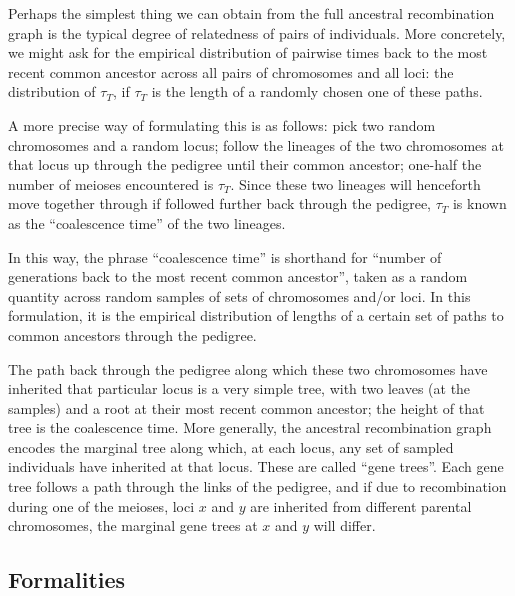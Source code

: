 Perhaps the simplest thing we can obtain from the full ancestral recombination graph 
is the typical degree of relatedness of pairs of individuals.
More concretely, we might ask for the empirical distribution
of pairwise times back to the most recent common ancestor
across all pairs of chromosomes and all loci:
the distribution of $\tau_T$, if $\tau_T$ is the length of a randomly chosen one of these paths.

A more precise way of formulating this is as follows:
pick two random chromosomes and a random locus;
follow the lineages of the two chromosomes at that locus up through the pedigree
until their common ancestor;
one-half the number of meioses encountered is $\tau_T$.
Since these two lineages will henceforth move together through if followed further back through the pedigree,
$\tau_T$ is known as the ``coalescence time'' of the two lineages.

In this way, the phrase ``coalescence time'' is shorthand
for ``number of generations back to the most recent common ancestor'',
taken as a random quantity across random samples of sets of chromosomes and/or loci.
In this formulation, it is the empirical distribution of lengths of a certain set of paths 
to common ancestors through the pedigree.

The path back through the pedigree along which these two chromosomes have inherited that particular locus
is a very simple tree, with two leaves (at the samples) and a root at their most recent common ancestor;
the height of that tree is the coalescence time.
More generally, the ancestral recombination graph encodes the marginal tree along which, 
at each locus, any set of sampled individuals have inherited at that locus.
These are called ``gene trees''.
Each gene tree follows a path through the links of the pedigree,
and if due to recombination during one of the meioses, 
loci $x$ and $y$ are inherited from different parental chromosomes,
the marginal gene trees at $x$ and $y$ will differ.


\subsection{Formalities}

